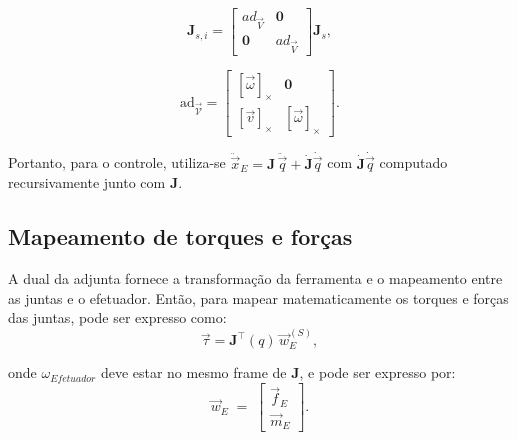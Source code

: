 \begin{equation}
\mathbf J_{s,i}=
\begin{bmatrix}
ad_{\vec V} & \mathbf 0\\
\mathbf 0   & ad_{\vec V}
\end{bmatrix}\mathbf J_s,
\end{equation}

\begin{equation}
\mathrm{ad}_{\vec{\mathcal V}}=
\begin{bmatrix}
[\vec\omega]_\times &\mathbf 0\\
[\vec v]_\times     &[\vec\omega]_\times
\end{bmatrix}.
\end{equation}

Portanto, para o controle,
utiliza-se $\ddot{\vec x}_E=\mathbf J\,\ddot{\vec q}+\dot{\mathbf J}\dot{\vec q}$
com $\dot{\mathbf J}\dot{\vec q}$
computado recursivamente junto com $\mathbf J$.




\subsection{Mapeamento de torques e forças}
A dual da adjunta fornece a transformação da ferramenta e o mapeamento entre as juntas e o efetuador.
Então, para mapear matematicamente os torques e forças das juntas, pode ser expresso como:
\begin{equation}
\label{eq:tau_torque1}
\vec\tau=\mathbf J^\top(q)\,\vec w_E^{(S)},
\end{equation}

onde $\omega_{Efetuador}$ deve estar no mesmo frame de $\mathbf{J}$, e pode ser expresso por:
\begin{equation}
\label{eq:tau_torque2}
\vec{w}_{E} \;=\;
\begin{bmatrix}
\vec{f}_{E}\\ \vec{m}_{E}
\end{bmatrix}.
\end{equation}

